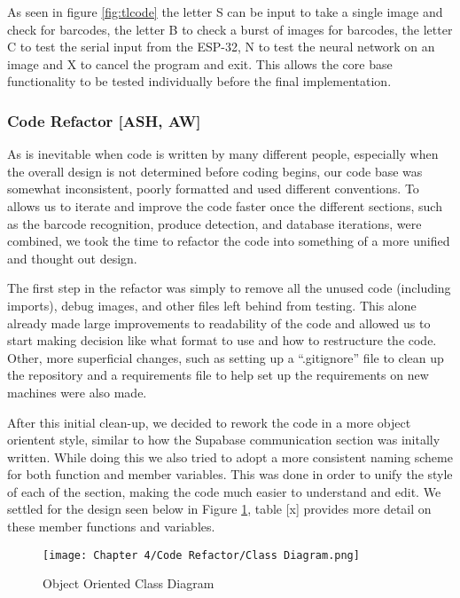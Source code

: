 As seen in figure \ref{fig:tlcode} the letter S can be input to take a single image and check for barcodes, the letter B to check a burst of images for barcodes, the letter C to test the serial input from the ESP-32, N to test the neural network on an image and X to cancel the program and exit.
This allows the core base functionality to be tested individually before the final implementation.

\subsubsection {Code Refactor [ASH, AW]}

As is inevitable when code is written by many different people, especially when the overall design is not determined before coding begins, our code base was somewhat inconsistent, poorly formatted and used different conventions.
To allows us to iterate and improve the code faster once the different sections, such as the barcode recognition, produce detection, and database iterations, were combined, we took the time to refactor the code into something of a more unified and thought out design.

The first step in the refactor was simply to remove all the unused code (including imports), debug images, and other files left behind from testing.
This alone already made large improvements to readability of the code and allowed us to start making decision like what format to use and how to restructure the code.
Other, more superficial changes, such as setting up a “.gitignore” file to clean up the repository and a requirements file to help set up the requirements on new machines were also made.

After this initial clean-up, we decided to rework the code in a more object orientent style, similar to how the Supabase communication section was initally written.
While doing this we also tried to adopt a more consistent naming scheme for both function and member variables.
This was done in order to unify the style of each of the section, making the code much easier to understand and edit.
We settled for the design seen below in Figure \ref{fig:oocd}, table [x] provides more detail on these member functions and variables.

\begin{figure}[H]        
    \centering
    \texttt{[image: Chapter 4/Code Refactor/Class Diagram.png]}
    \caption{Object Oriented Class Diagram}
    \label{fig:oocd}
\end{figure} 

